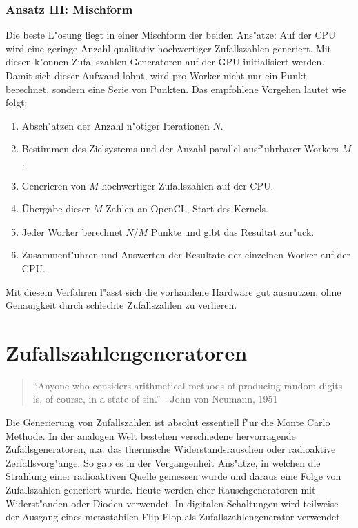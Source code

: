 \begin{refsection}
\subsubsection{Ansatz III: Mischform}
Die beste L"osung liegt in einer Mischform der beiden Ans"atze: Auf
der CPU wird eine geringe Anzahl qualitativ hochwertiger Zufallszahlen
generiert. Mit diesen k"onnen Zufallszahlen-Generatoren auf der GPU
initialisiert werden. Damit sich dieser Aufwand lohnt, wird pro Worker
nicht nur ein Punkt berechnet, sondern eine Serie von Punkten. Das
empfohlene Vorgehen lautet wie folgt:
\newpage
\begin{enumerate}
\item Absch"atzen der Anzahl n"otiger Iterationen $N$.
\item Bestimmen des Zielsystems und der Anzahl parallel ausf"uhrbarer
Workers $M$.
\item Generieren von $M$ hochwertiger Zufallszahlen auf der CPU.
\item Übergabe dieser $M$ Zahlen an OpenCL, Start des Kernels.
\item Jeder Worker berechnet $N/M$ Punkte und gibt das Resultat zur"uck.
\item Zusammenf"uhren und Auswerten der Resultate der einzelnen Worker
auf der CPU.
\end{enumerate}

Mit diesem Verfahren l"asst sich die vorhandene Hardware gut ausnutzen,
ohne Genauigkeit durch schlechte Zufallszahlen zu verlieren.

\section{Zufallszahlengeneratoren} 

\begin{quote}
``Anyone who considers arithmetical methods of producing random digits
is, of course, in a state of sin.'' - John von Neumann, 1951
\end{quote}

Die Generierung von Zufallszahlen ist absolut essentiell f"ur die Monte
Carlo Methode. In der analogen Welt bestehen verschiedene hervorragende
Zufallsgeneratoren, u.a. das thermische Widerstandsrauschen oder
radioaktive Zerfallsvorg"ange. So gab es in der Vergangenheit Ans"atze,
in welchen die Strahlung einer radioaktiven Quelle gemessen wurde und
daraus eine Folge von Zufallszahlen generiert wurde. Heute werden eher
Rauschgeneratoren mit Widerst"anden oder Dioden verwendet. In digitalen
Schaltungen wird teilweise der Ausgang eines metastabilen Flip-Flop als
Zufallszahlengenerator verwendet.


\end{refsection}
